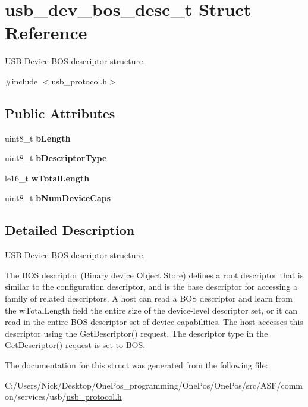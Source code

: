 \hypertarget{structusb__dev__bos__desc__t}{\section{usb\-\_\-dev\-\_\-bos\-\_\-desc\-\_\-t Struct Reference}
\label{structusb__dev__bos__desc__t}
}


U\-S\-B Device B\-O\-S descriptor structure.  




{\ttfamily \#include $<$usb\-\_\-protocol.\-h$>$}

\subsection*{Public Attributes}
\begin{DoxyCompactItemize}
\item 
\hypertarget{structusb__dev__bos__desc__t_a4af3986ecabf5953fe6cb9c425f75477}{uint8\-\_\-t {\bfseries b\-Length}}\label{structusb__dev__bos__desc__t_a4af3986ecabf5953fe6cb9c425f75477}

\item 
\hypertarget{structusb__dev__bos__desc__t_a4f7474c73d7398723f958a2e716a54f3}{uint8\-\_\-t {\bfseries b\-Descriptor\-Type}}\label{structusb__dev__bos__desc__t_a4f7474c73d7398723f958a2e716a54f3}

\item 
\hypertarget{structusb__dev__bos__desc__t_aac3dc343f13ac0988c2cb7d9e68816ff}{le16\-\_\-t {\bfseries w\-Total\-Length}}\label{structusb__dev__bos__desc__t_aac3dc343f13ac0988c2cb7d9e68816ff}

\item 
\hypertarget{structusb__dev__bos__desc__t_a75f7ce415537c341b4e42bca1056e052}{uint8\-\_\-t {\bfseries b\-Num\-Device\-Caps}}\label{structusb__dev__bos__desc__t_a75f7ce415537c341b4e42bca1056e052}

\end{DoxyCompactItemize}


\subsection{Detailed Description}
U\-S\-B Device B\-O\-S descriptor structure. 

The B\-O\-S descriptor (Binary device Object Store) defines a root descriptor that is similar to the configuration descriptor, and is the base descriptor for accessing a family of related descriptors. A host can read a B\-O\-S descriptor and learn from the w\-Total\-Length field the entire size of the device-\/level descriptor set, or it can read in the entire B\-O\-S descriptor set of device capabilities. The host accesses this descriptor using the Get\-Descriptor() request. The descriptor type in the Get\-Descriptor() request is set to B\-O\-S. 

The documentation for this struct was generated from the following file\-:\begin{DoxyCompactItemize}
\item 
C\-:/\-Users/\-Nick/\-Desktop/\-One\-Pos\-\_\-programming/\-One\-Pos/\-One\-Pos/src/\-A\-S\-F/common/services/usb/\hyperlink{usb__protocol_8h}{usb\-\_\-protocol.\-h}\end{DoxyCompactItemize}
